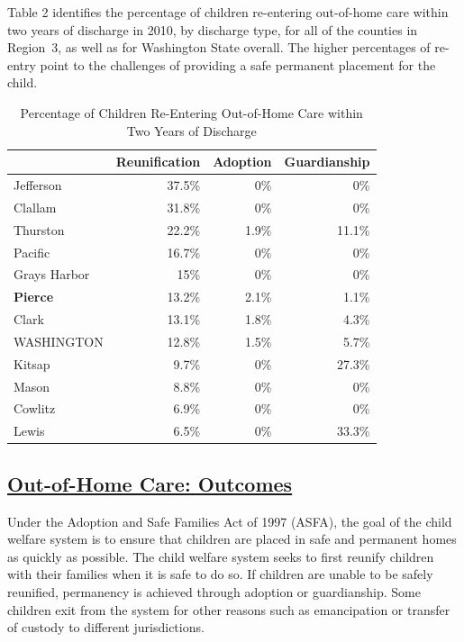 \documentclass{article}\usepackage{graphicx, color}
\begin{document}
Table 2 identifies the percentage of children re-entering out-of-home care within two years of discharge in 2010, by discharge type, for all of the counties in Region~3, as well as for Washington State overall. The higher percentages of re-entry point to the challenges of providing a safe permanent placement for the child.
\nopagebreak[3]
\begin{table}[ht]
\centering
\caption{Percentage of Children Re-Entering Out-of-Home Care within Two Years of Discharge} 
\begin{tabular}{lrrr}
  \toprule
 & Reunification & Adoption & Guardianship \\ 
  \midrule
Jefferson & 37.5\% & 0\% & 0\% \\ 
  Clallam & 31.8\% & 0\% & 0\% \\ 
  Thurston & 22.2\% & 1.9\% & 11.1\% \\ 
  Pacific & 16.7\% & 0\% & 0\% \\ 
  Grays Harbor & 15\% & 0\% & 0\% \\ 
  \textbf{Pierce} & 13.2\% & 2.1\% & 1.1\% \\ 
  Clark & 13.1\% & 1.8\% & 4.3\% \\ 
  WASHINGTON & 12.8\% & 1.5\% & 5.7\% \\ 
  Kitsap & 9.7\% & 0\% & 27.3\% \\ 
  Mason & 8.8\% & 0\% & 0\% \\ 
  Cowlitz & 6.9\% & 0\% & 0\% \\ 
  Lewis & 6.5\% & 0\% & 33.3\% \\ 
   \bottomrule
\end{tabular}
\end{table}



\subsection{\href{http://www.partnersforourchildren.org/child-well-being/visualizations/out-home-care/outcomes}
    {Out-of-Home Care: Outcomes}
}
Under the Adoption and Safe Families Act of 1997 (ASFA), the goal of the child welfare system is to ensure that children are placed in safe and permanent homes as quickly as possible. The child welfare system seeks to first reunify children with their families when it is safe to do so. If children are unable to be safely reunified, permanency is achieved through adoption or guardianship. Some children exit from the system for other reasons such as emancipation or transfer of custody to different jurisdictions.
\end{document}
